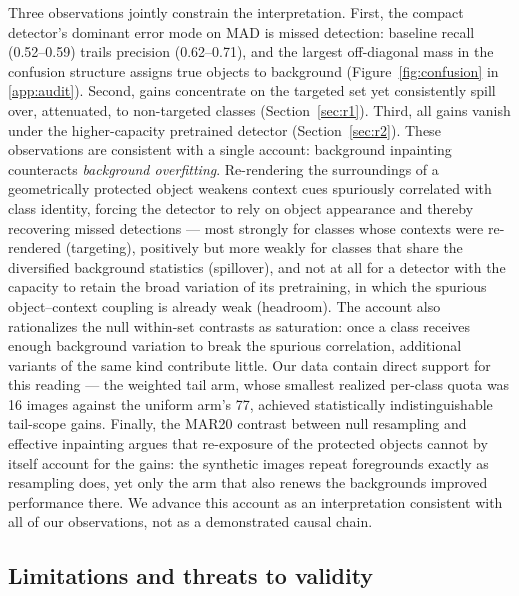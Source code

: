 \documentclass[preprint,12pt,authoryear]{elsarticle}
\begin{document}
Three observations jointly constrain the interpretation. First, the
compact detector's dominant error mode on MAD is missed detection:
baseline recall (0.52--0.59) trails precision (0.62--0.71), and the
largest off-diagonal mass in the confusion structure assigns true
objects to background (Figure~\ref{fig:confusion} in \ref{app:audit}). Second, gains concentrate on the targeted set yet
consistently spill over, attenuated, to non-targeted classes
(Section~\ref{sec:r1}). Third, all gains vanish under the
higher-capacity pretrained detector (Section~\ref{sec:r2}). These
observations are consistent with a single account: background inpainting
counteracts \emph{background overfitting}. Re-rendering the surroundings
of a geometrically protected object weakens context cues spuriously
correlated with class identity, forcing the detector to rely on object
appearance and thereby recovering missed detections --- most strongly
for classes whose contexts were re-rendered (targeting), positively but
more weakly for classes that share the diversified background statistics
(spillover), and not at all for a detector with the capacity to retain
the broad variation of its pretraining, in which the spurious
object--context coupling is already weak (headroom). The account also
rationalizes the null within-set contrasts as saturation: once a class
receives enough background variation to break the spurious correlation,
additional variants of the same kind contribute little. Our data contain
direct support for this reading --- the weighted tail arm, whose
smallest realized per-class quota was 16 images against the uniform
arm's 77, achieved statistically indistinguishable tail-scope gains.
Finally, the MAR20 contrast between null resampling and effective
inpainting argues that re-exposure of the protected objects cannot by
itself account for the gains: the synthetic images repeat foregrounds
exactly as resampling does, yet only the arm that also renews the
backgrounds improved performance there. We advance this account as an
interpretation consistent with all of our observations, not as a
demonstrated causal chain.

\subsection{Limitations and threats to validity}
\end{document}
